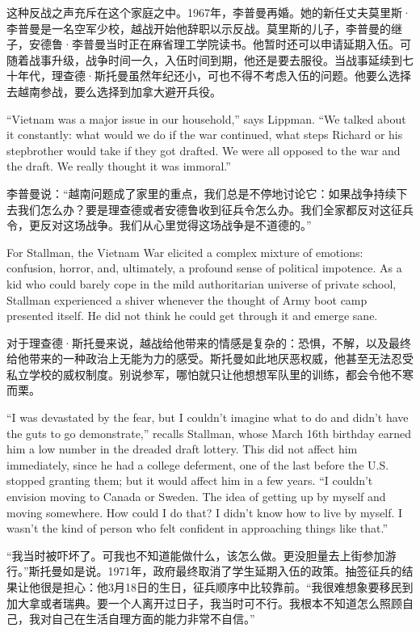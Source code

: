 \ifdefined\chs
这种反战之声充斥在这个家庭之中。1967年，李普曼再婚。她的新任丈夫莫里斯·李普曼是一名空军少校，越战开始他辞职以示反战。莫里斯的儿子，李普曼的继子，安德鲁·李普曼当时正在麻省理工学院读书。他暂时还可以申请延期入伍。可随着战事升级，战争时间一久，入伍时间到期，他还是要去服役。当战事延续到七十年代，理查德·斯托曼虽然年纪还小，可也不得不考虑入伍的问题。他要么选择去越南参战，要么选择到加拿大避开兵役。
\fi

\ifdefined\eng
``Vietnam was a major issue in our household,'' says Lippman. ``We talked about it constantly: what would we do if the war continued, what steps Richard or his stepbrother would take if they got drafted. We were all opposed to the war and the draft. We really thought it was immoral.''
\fi

\ifdefined\chs
李普曼说：``越南问题成了家里的重点，我们总是不停地讨论它：如果战争持续下去我们怎么办？要是理查德或者安德鲁收到征兵令怎么办。我们全家都反对这征兵令，更反对这场战争。我们从心里觉得这场战争是不道德的。''
\fi

\ifdefined\eng
For Stallman, the Vietnam War elicited a complex mixture of emotions: confusion, horror, and, ultimately, a profound sense of political impotence. As a kid who could barely cope in the mild authoritarian universe of private school, Stallman experienced a shiver whenever the thought of Army boot camp presented itself. He did not think he could get through it and emerge sane.
\fi

\ifdefined\chs
对于理查德·斯托曼来说，越战给他带来的情感是复杂的：恐惧，不解，以及最终给他带来的一种政治上无能为力的感受。斯托曼如此地厌恶权威，他甚至无法忍受私立学校的威权制度。别说参军，哪怕就只让他想想军队里的训练，都会令他不寒而栗。
\fi

\ifdefined\eng
``I was devastated by the fear, but I couldn't imagine what to do and didn't have the guts to go demonstrate,'' recalls Stallman, whose March 16th birthday earned him a low number in the dreaded draft lottery.  This did not affect him immediately, since he had a college deferment, one of the last before the U.S. stopped granting them; but it would affect him in a few years. ``I couldn't envision moving to Canada or Sweden. The idea of getting up by myself and moving somewhere. How could I do that? I didn't know how to live by myself. I wasn't the kind of person who felt confident in approaching things like that.''
\fi

\ifdefined\chs
``我当时被吓坏了。可我也不知道能做什么，该怎么做。更没胆量去上街参加游行。''斯托曼如是说。1971年，政府最终取消了学生延期入伍的政策。抽签征兵的结果让他很是担心：他3月18日的生日，征兵顺序中比较靠前。``我很难想象要移民到加大拿或者瑞典。要一个人离开过日子，我当时可不行。我根本不知道怎么照顾自己，我对自己在生活自理方面的能力非常不自信。''
\fi

